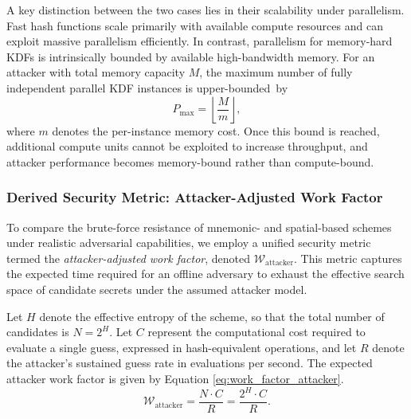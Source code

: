 \documentclass[mathematics,article,accept,pdftex,moreauthors]{Definitions/mdpi}
\begin{document}
A key distinction between the two cases lies in their scalability under parallelism. Fast hash functions scale primarily with available compute resources and can exploit massive parallelism efficiently. In contrast, parallelism for memory-hard KDFs is intrinsically bounded by available high-bandwidth memory. For an attacker with total memory capacity $M$, the maximum number of fully independent parallel KDF instances is upper-\mbox{bounded by}
\[
P_{\max} = \left\lfloor \frac{M}{m} \right\rfloor ,
\]
where $m$ denotes the per-instance memory cost. Once this bound is reached, additional compute units cannot be exploited to increase throughput, and attacker performance becomes memory-bound rather than compute-bound.

\subsubsection{Derived Security Metric: Attacker-Adjusted Work Factor}

To compare the brute-force resistance of mnemonic- and spatial-based schemes under realistic adversarial capabilities, we employ a unified security metric termed the \emph{attacker-adjusted work factor}, denoted $\mathcal{W}_{\text{attacker}}$. This metric captures the expected time required for an offline adversary to exhaust the effective search space of candidate secrets under the assumed attacker model.

Let $H$ denote the effective entropy of the scheme, so that the total number of candidates is $N = 2^{H}$. Let $C$ represent the computational cost required to evaluate a single guess, expressed in hash-equivalent operations, and let $R$ denote the attacker’s sustained guess rate in evaluations per second. The expected attacker work factor is given by Equation \eqref{eq:work_factor_attacker}.
\begin{equation}
\mathcal{W}_{\text{attacker}} = \frac{N \cdot C}{R} = \frac{2^{H} \cdot C}{R}.
\label{eq:work_factor_attacker}
\end{equation}
\end{document}
